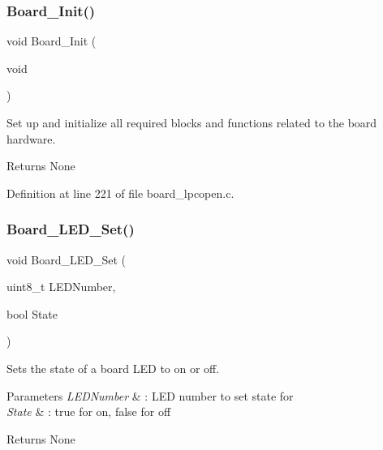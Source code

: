 \subsubsection{\texorpdfstring{Board\+\_\+\+Init()}{Board\_Init()}}
{\footnotesize\ttfamily void Board\+\_\+\+Init (\begin{DoxyParamCaption}\item[{void}]{ }\end{DoxyParamCaption})}



Set up and initialize all required blocks and functions related to the board hardware. 

\begin{DoxyReturn}{Returns}
None 
\end{DoxyReturn}


Definition at line 221 of file board\+\_\+lpcopen.\+c.

\mbox{\label{group___b_o_a_r_d___c_o_m_m_o_n___a_p_i_ga4beb63d516764b260e9798642fab0047}} 
\subsubsection{\texorpdfstring{Board\+\_\+\+L\+E\+D\+\_\+\+Set()}{Board\_LED\_Set()}}
{\footnotesize\ttfamily void Board\+\_\+\+L\+E\+D\+\_\+\+Set (\begin{DoxyParamCaption}\item[{uint8\+\_\+t}]{L\+E\+D\+Number,  }\item[{bool}]{State }\end{DoxyParamCaption})}



Sets the state of a board L\+ED to on or off. 


\begin{DoxyParams}{Parameters}
{\em L\+E\+D\+Number} & \+: L\+ED number to set state for \\
\hline
{\em State} & \+: true for on, false for off \\
\hline
\end{DoxyParams}
\begin{DoxyReturn}{Returns}
None 
\end{DoxyReturn}


